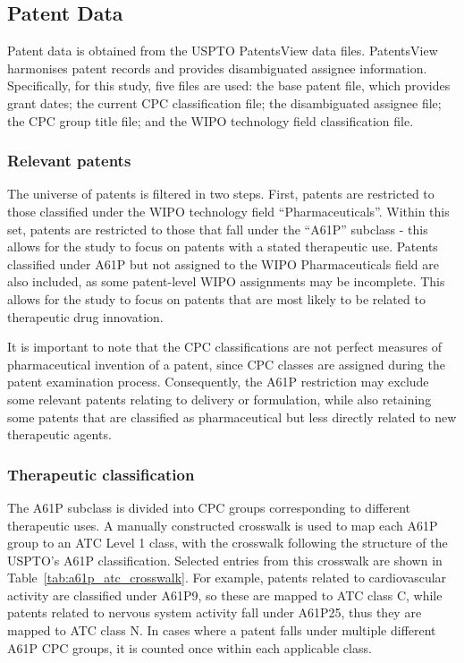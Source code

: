 \documentclass[12pt]{article}
\begin{document}
\subsection{Patent Data}
\label{sec:patents}

Patent data is obtained from the USPTO PatentsView data files. PatentsView harmonises patent records and provides disambiguated assignee information. Specifically, for this study, five files are used: the base patent file, which provides grant dates; the current CPC classification file; the disambiguated assignee file; the CPC group title file; and the WIPO technology field classification file.

\subsubsection{Relevant patents}

The universe of patents is filtered in two steps. First, patents are restricted to those classified under the WIPO technology field ``Pharmaceuticals''. Within this set, patents are restricted to those that fall under the ``A61P'' subclass - this allows for the study to focus on patents with a stated therapeutic use. Patents classified under A61P but not assigned to the WIPO Pharmaceuticals field are also included, as some patent-level WIPO assignments may be incomplete. This allows for the study to focus on patents that are most likely to be related to therapeutic drug innovation.

It is important to note that the CPC classifications are not perfect measures of pharmaceutical invention of a patent, since CPC classes are assigned during the patent examination process. Consequently, the A61P restriction may exclude some relevant patents relating to delivery or formulation, while also retaining some patents that are classified as pharmaceutical but less directly related to new therapeutic agents.

\subsubsection{Therapeutic classification}

The A61P subclass is divided into CPC groups corresponding to different therapeutic uses. A manually constructed crosswalk is used to map each A61P group to an ATC Level 1 class, with the crosswalk following the structure of the USPTO's A61P classification. Selected entries from this crosswalk are shown in Table~\ref{tab:a61p_atc_crosswalk}. For example, patents related to cardiovascular activity are classified under A61P9, so these are mapped to ATC class C, while patents related to nervous system activity fall under A61P25, thus they are mapped to ATC class N. In cases where a patent falls under multiple different A61P CPC groups, it is counted once within each applicable class.
\end{document}
